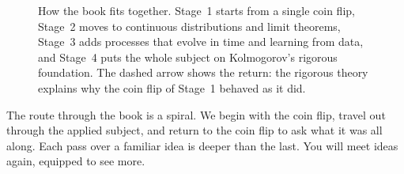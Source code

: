 \begin{figure}[H]
\caption{How the book fits together. Stage~1 starts from a single coin flip, Stage~2 moves to continuous distributions and limit theorems, Stage~3 adds processes that evolve in time and learning from data, and Stage~4 puts the whole subject on Kolmogorov's rigorous foundation. The dashed arrow shows the return: the rigorous theory explains why the coin flip of Stage~1 behaved as it did.}
\label{ch00:book-roadmap}
\end{figure}

\begin{aestheticbox}
The route through the book is a spiral. We begin with the
coin flip, travel out through the applied subject, and return to the coin
flip to ask what it was all along. Each pass over a familiar idea is
deeper than the last. You will meet ideas again, equipped to see more.
\end{aestheticbox}

